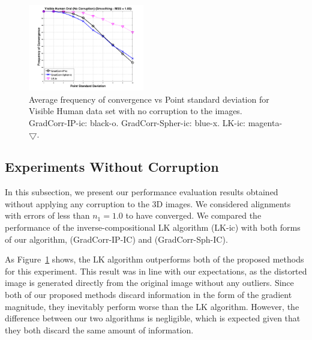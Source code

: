 \begin{figure}[h]
    \includegraphics[width=0.45\textwidth]{images/results/nocorruption}
    \caption{Average frequency of convergence vs Point standard deviation for Visible Human data set with no corruption to the images. GradCorr-IP-ic: black-o. GradCorr-Spher-ic: blue-x. LK-ic: magenta-$\bigtriangledown$.}
    \label{fig:results-nocorruption}
\end{figure}

\subsection{Experiments Without Corruption}\label{subsec:results-nocorruption}
In this subsection, we present our performance evaluation results obtained without applying any corruption to the 3D images. We considered alignments with errors of less than $n_1 = 1.0$ to have converged. We compared the performance of the inverse-compositional LK algorithm (LK-ic) with both forms of our algorithm, (GradCorr-IP-IC) and (GradCorr-Sph-IC). 

As Figure~\ref{fig:results-nocorruption} shows, the LK algorithm outperforms both of the proposed methods for this experiment. This result was in line with our expectations, as the distorted image is generated directly from the original image without any outliers. Since both of our proposed methods discard information in the form of the gradient magnitude, they inevitably perform worse than the LK algorithm. However, the difference between our two algorithms is negligible, which is expected given that they both discard the same amount of information.

